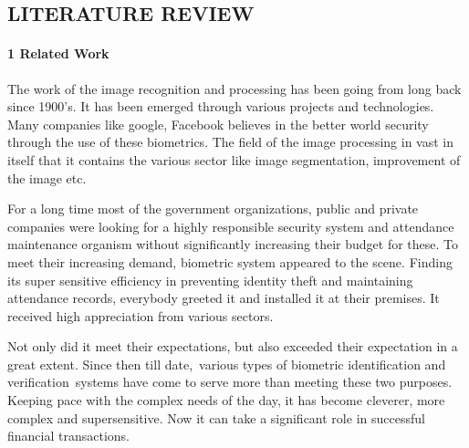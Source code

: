\documentclass{article} %
\begin{document}
\noindent 

\noindent 

\noindent 

\noindent 

\noindent 

\noindent 

\noindent 

\noindent \textbf{ }

\noindent 
\subsection{ LITERATURE REVIEW }

\noindent  

\noindent 

\noindent 
\paragraph{1 Related Work }

\textbf{             }The work of the image recognition and processing has been going from long back since 1900's. It has been emerged through various projects and technologies. Many companies like google, Facebook believes in the better world security through the use of these biometrics. The field of the image processing in vast in itself that it contains the various sector like image segmentation, improvement of the image\textbf{ }etc.\textbf{}

\noindent                             For a long time most of the government organizations, public and private companies were looking for a highly responsible security system and attendance maintenance organism without significantly increasing their budget for these. To meet their increasing demand, biometric system appeared to the scene. Finding its super sensitive efficiency in preventing identity theft and maintaining attendance records, everybody greeted it and installed it at their premises. It received high appreciation from various sectors.

\noindent 

\noindent                                  Not only did it meet their expectations, but also exceeded their expectation in a great extent. Since then till date,~various types of biometric identification and verification~systems have come to serve more than meeting these two purposes. Keeping pace with the complex needs of the day, it has become cleverer, more complex and supersensitive. Now it can take a significant role in successful financial transactions.
\end{document}
